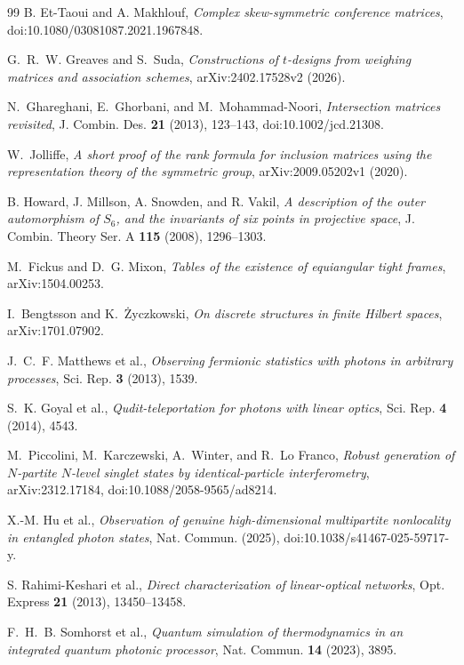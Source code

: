 \documentclass[11pt]{article}
\theoremstyle{remark}
\begin{document}
\begin{thebibliography}{99}
B. Et-Taoui and A. Makhlouf,
\emph{Complex skew-symmetric conference matrices},
doi:10.1080/03081087.2021.1967848.

G.~R.~W. Greaves and S.~Suda,
\emph{Constructions of \(t\)-designs from weighing matrices and association
schemes},
arXiv:2402.17528v2 (2026).

N.~Ghareghani, E.~Ghorbani, and M.~Mohammad-Noori,
\emph{Intersection matrices revisited},
J. Combin. Des. \textbf{21} (2013), 123--143,
doi:10.1002/jcd.21308.

W.~Jolliffe,
\emph{A short proof of the rank formula for inclusion matrices using the
representation theory of the symmetric group},
arXiv:2009.05202v1 (2020).

B. Howard, J. Millson, A. Snowden, and R. Vakil,
\emph{A description of the outer automorphism of \(S_6\), and the invariants
of six points in projective space},
J. Combin. Theory Ser. A \textbf{115} (2008), 1296--1303.

M.~Fickus and D.~G. Mixon,
\emph{Tables of the existence of equiangular tight frames},
arXiv:1504.00253.

I.~Bengtsson and K.~\.{Z}yczkowski,
\emph{On discrete structures in finite Hilbert spaces},
arXiv:1701.07902.

J.~C.~F. Matthews et al.,
\emph{Observing fermionic statistics with photons in arbitrary processes},
Sci. Rep. \textbf{3} (2013), 1539.

S.~K. Goyal et al.,
\emph{Qudit-teleportation for photons with linear optics},
Sci. Rep. \textbf{4} (2014), 4543.

M.~Piccolini, M.~Karczewski, A.~Winter, and R.~Lo Franco,
\emph{Robust generation of \(N\)-partite \(N\)-level singlet states by
identical-particle interferometry},
arXiv:2312.17184, doi:10.1088/2058-9565/ad8214.

X.-M. Hu et al.,
\emph{Observation of genuine high-dimensional multipartite nonlocality in
entangled photon states},
Nat. Commun. (2025), doi:10.1038/s41467-025-59717-y.

S. Rahimi-Keshari et al.,
\emph{Direct characterization of linear-optical networks},
Opt. Express \textbf{21} (2013), 13450--13458.

F.~H.~B. Somhorst et al.,
\emph{Quantum simulation of thermodynamics in an integrated quantum photonic
processor},
Nat. Commun. \textbf{14} (2023), 3895.

\end{thebibliography}
\endgroup
\end{document}
